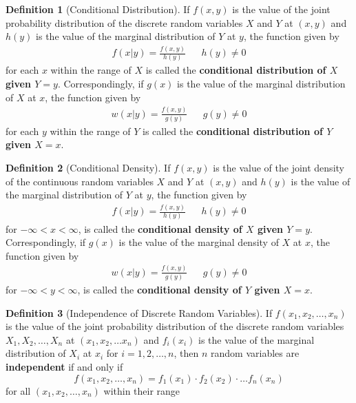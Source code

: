 \documentclass[
10pt,reqno
]{amsart}
\theoremstyle{definition}
\newtheorem{definition}{Definition}[section]
\begin{document}
\begin{definition}[Conditional Distribution]
If \(f(x,y)\) is the value of the joint probability distribution of the discrete random variables \(X\) and \(Y\) at \((x,y)\) and \(h(y)\) is the value of the marginal distribution of \(Y\) at \(y\), the function given by
\begin{align*}
f(x|y)=\frac{f(x,y)}{h(y)} && h(y) \ne 0
\end{align*}
for each \(x\) within the range of \(X\) is called the \textbf{conditional distribution of \(X\) given \(Y=y\)}. Correspondingly, if \(g(x)\) is the value of the marginal distribution of \(X\) at \(x\), the function given by
\begin{align*}
w(x|y)=\frac{f(x,y)}{g(y)} && g(y) \ne 0
\end{align*}
for each \(y\) within the range of \(Y\) is called the \textbf{conditional distribution of \(Y\) given \(X=x\)}.
\end{definition}

\newpage

\begin{definition}[Conditional Density]
If \(f(x,y)\) is the value of the joint density of the continuous random variables \(X\) and \(Y\) at \((x,y)\) and \(h(y)\) is the value of the marginal distribution of \(Y\) at \(y\), the function given by
\begin{align*}
f(x|y)=\frac{f(x,y)}{h(y)} && h(y) \ne 0
\end{align*}
for \(-\infty < x < \infty \), is called the \textbf{conditional density of \(X\) given \(Y=y\)}. Correspondingly, if \(g(x)\) is the value of the marginal density of \(X\) at \(x\), the function given by
\begin{align*}
w(x|y)=\frac{f(x,y)}{g(y)} && g(y) \ne 0
\end{align*}
for \(-\infty < y < \infty \), is called the \textbf{conditional density of \(Y\) given \(X=x\)}.
\end{definition}

\begin{definition}[Independence of Discrete Random Variables]
If \(f(x_1,x_2,\ldots , x_n)\) is the value of the joint probability distribution of the discrete random variables \(X_1, X_2, \ldots, X_n\) at \((x_1, x_2, \ldots x_n)\) and \(f_i(x_i)\) is the value of the marginal distribution of \(X_i\) at \(x_i\) for \(i=1,2,\ldots,n\), then \(n\) random variables are \textbf{independent} if and only if
\[
f(x_1,x_2,\ldots,x_n)=f_1(x_1)\cdot f_2(x_2)\cdot \ldots f_n(x_n)
\]
for all \((x_1, x_2, \ldots, x_n)\) within their range
\end{definition}
\end{document}
